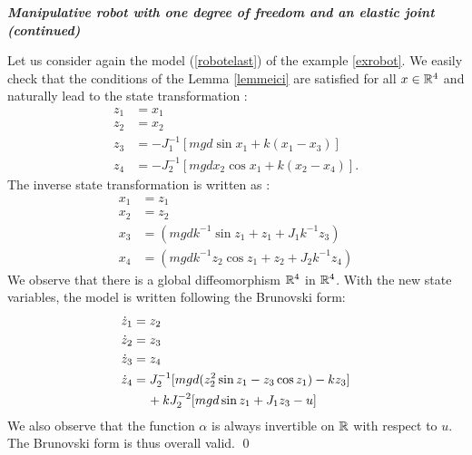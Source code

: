 \begin{exemple}{\bf \em Manipulative robot with one degree of freedom and an elastic joint (continued)}

Let us consider again the model (\ref{robotelast}) of the example \ref{exrobot}. We easily check that the conditions of the Lemma \ref{lemmeici} are satisfied for all $x \in \mathbb{R}^4$ and naturally lead to the state transformation :
\begin{equation*} \begin{split} 
z_1 &= x_1 \\
z_2 &= x_2 \\
z_3 &= -J_1^{-1}[mgd\sin x_1 + k(x_1 -x_3)] \\
z_4 &= -J_2^{-1}[mgdx_2 \cos x_1 + k(x_2 - x_4)].
\end{split} \end{equation*}
The inverse state transformation is written as :
\begin{equation*} \begin{split} 
x_1 &= z_1 \\
x_2 &= z_2 \\
x_3 &= (mgdk^{-1} \sin z_1 + z_1 + J_1k^{-1}z_3) \\
x_4 &= (mgdk^{-1} z_2 \cos z_1 + z_2 + J_2k^{-1}z_4) 
\end{split} \end{equation*}
We observe that there is a global diffeomorphism $\mathbb{R}^4$  in $\mathbb{R}^4$. With the new state variables, the model is written following the Brunovski form:
\begin{equation*} \begin{split} 
\dot z_1 &= z_2 \\
\dot z_2 &= z_3 \\
\dot z_3 &= z_4 \\
\dot z_4 &= J_2^{-1}[mgd(z_2^2 \sin z_1 - z_3 \cos z_1) -k z_3] \\ & \hh \hh + kJ_2^{-2}[mgd\sin z_1 + J_1z_3 - u]
\end{split} \end{equation*}
We also observe that the function $\alpha$ is always invertible on $\mathbb{R}$ with respect to $u$. The Brunovski form is thus overall valid.
\qed
\end{exemple}
 
